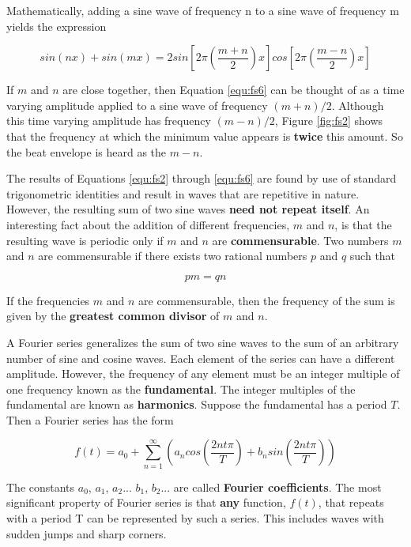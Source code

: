 Mathematically, adding a sine wave of frequency n to a sine wave of frequency m yields the expression

\begin{equation}
sin(nx)+sin(mx)=2sin\left[2\pi\left(\dfrac{m+n}{2}\right)x\right]cos\left[2\pi\left(\dfrac{m-n}{2}\right)x\right]
\label{equ:fs6}
\end{equation}

If $m$ and $n$ are close together, then Equation \ref{equ:fs6} can be thought of as a time varying amplitude applied to a sine wave of frequency $(m+n)/2$. Although this time varying amplitude has frequency $(m-n)/2$, Figure \ref{fig:fs2} shows that the frequency at which the minimum value appears is {\bf twice} this amount. So the beat envelope is heard as the $m-n$.

The results of Equations \ref{equ:fs2} through \ref{equ:fs6} are found by use of standard trigonometric identities and result in waves that are repetitive in nature. However, the resulting sum of two sine waves {\bf need not repeat itself}. An interesting fact about the addition of different frequencies, $m$ and $n$, is that the resulting wave is periodic only if $m$ and $n$ are {\bf commensurable}. Two numbers $m$ and $n$ are commensurable if there exists two rational numbers $p$ and $q$ such that

\begin{equation}
pm=qn
\label{equ:fs7}
\end{equation}

If the frequencies $m$ and $n$ are commensurable, then the frequency of the sum is given by the {\bf greatest common divisor} of $m$ and $n$.

A Fourier series generalizes the sum of two sine waves to the sum of an arbitrary number of sine and cosine waves. Each element of the series can have a different amplitude. However, the frequency of any element must be an integer multiple of one frequency known as the {\bf fundamental}. The integer multiples of the fundamental are known as {\bf harmonics}. Suppose the fundamental has a period $T$. Then a Fourier series has the form 

\begin{equation}
f(t)=a_0+\sum^{\infty}_{n=1}\left(a_ncos\left(\dfrac{2nt\pi}{T}\right)+b_nsin\left(\dfrac{2nt\pi}{T}\right)\right)
\label{equ:fs8}
\end{equation}

The constants $a_0$, $a_1$, $a_2$... $b_1$, $b_2$... are called {\bf Fourier coefficients}. The most significant property of Fourier series is that {\bf any} function, $f(t)$, that repeats with a period T can be represented by such a series. This includes waves with sudden jumps and sharp corners.

